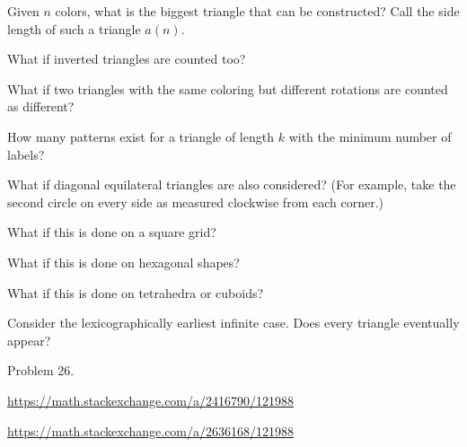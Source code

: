 \documentclass{article}
\begin{document}
\begin{question}
  Given $n$ colors, what is the biggest triangle that can be constructed?
  Call the side length of such a triangle $a(n)$.
\end{question}
\begin{related}
  \item What if inverted triangles are counted too?
  \item What if two triangles with the same coloring but different rotations are
    counted as different?
  \item How many patterns exist for a triangle of length $k$ with the minimum
    number of labels?
  \item What if diagonal equilateral triangles are also considered?
    (For example, take the second circle on every side as measured clockwise
    from each corner.)
  \item What if this is done on a square grid?
  \item What if this is done on hexagonal shapes?
  \item What if this is done on tetrahedra or cuboids?
  \item Consider the lexicographically earliest infinite case. Does every
    triangle eventually appear?
\end{related}
\begin{references}
  \item Problem 26.
  \item \url{https://math.stackexchange.com/a/2416790/121988}
  \item \url{https://math.stackexchange.com/a/2636168/121988}
\end{references}
\end{document}
